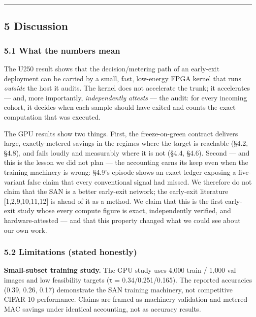 \documentclass[
]{article}
\begin{document}
\begin{center}\rule{0.5\linewidth}{0.5pt}\end{center}

\hypertarget{discussion}{%
\subsection{5 Discussion}\label{discussion}}

\hypertarget{what-the-numbers-mean}{%
\subsubsection{5.1 What the numbers mean}\label{what-the-numbers-mean}}

The U250 result shows that the decision/metering path of an early-exit
deployment can be carried by a small, fast, low-energy FPGA kernel that
runs \emph{outside} the host it audits. The kernel does not accelerate
the trunk; it accelerates --- and, more importantly, \emph{independently
attests} --- the audit: for every incoming cohort, it decides when each
sample should have exited and counts the exact computation that was
executed.

The GPU results show two things. First, the freeze-on-green contract
delivers large, exactly-metered savings in the regimes where the target
is reachable (§4.2, §4.8), and fails loudly and measurably where it is
not (§4.4, §4.6). Second --- and this is the lesson we did not plan ---
the accounting earns its keep even when the training machinery is wrong:
§4.9's episode shows an exact ledger exposing a five-variant false claim
that every conventional signal had missed. We therefore do not claim
that the SAN is a better early-exit network; the early-exit literature
{[}1,2,9,10,11,12{]} is ahead of it as a method. We claim that this is
the first early-exit study whose every compute figure is exact,
independently verified, and hardware-attested --- and that this property
changed what we could see about our own work.

\hypertarget{limitations-stated-honestly}{%
\subsubsection{5.2 Limitations (stated
honestly)}\label{limitations-stated-honestly}}

\textbf{Small-subset training study.} The GPU study uses 4,000 train /
1,000 val images and low feasibility targets (τ = 0.34/0.251/0.165). The
reported accuracies (0.39, 0.26, 0.17) demonstrate the SAN training
machinery, not competitive CIFAR-10 performance. Claims are framed as
machinery validation and metered-MAC savings under identical accounting,
not as accuracy results.
\end{document}
